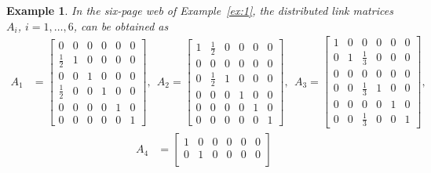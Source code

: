 \documentclass[11pt,draftcls,onecolumn]{IEEEtran}
\newtheorem{example}[theorem]{Example}
\begin{document}
\begin{example}\label{ex:3}\rm
In the six-page web of Example~\ref{ex:1}, 
the distributed link matrices $A_i$, $i=1,\ldots,6$, can be obtained as
\begin{align*}
A_1
  &= \begin{bmatrix}
       0           & 0 & 0           & 0 & 0 & 0\\
       \frac{1}{2} & 1 & 0           & 0 & 0 & 0\\
       0           & 0           & 1           & 0 & 0 & 0\\
       \frac{1}{2} & 0           & 0           & 1 & 0 & 0\\
       0           & 0           & 0           & 0 & 1 & 0\\
       0           & 0           & 0           & 0 & 0 & 1
     \end{bmatrix},~~
 A_2
  = \begin{bmatrix}
       1 &  \frac{1}{2}& 0           & 0 & 0 & 0\\
       0 & 0           &   0& 0 & 0 & 0\\
       0           &  \frac{1}{2}& 1 & 0 & 0 & 0\\
       0           & 0           & 0           & 1 & 0 & 0\\
       0           & 0           & 0           & 0 & 1 & 0\\
       0           & 0           & 0           & 0 & 0 & 1
     \end{bmatrix},~~
 A_3
  = \begin{bmatrix}
       1 & 0 & 0           & 0           & 0 & 0\\
       0 & 1           & \frac{1}{3} & 0           & 0 & 0\\
       0 & 0 & 0           & 0 & 0 & 0\\
       0 & 0           & \frac{1}{3} & 1 & 0 & 0\\
       0 & 0           & 0           & 0           & 1 & 0\\
       0 & 0           & \frac{1}{3} & 0           & 0 & 1
     \end{bmatrix},
\end{align*}
\begin{align*}
A_4
  &= \begin{bmatrix}
       1           & 0 & 0           & 0 & 0 & 0\\
       0 & 1 & 0           & 0 & 0 & 0\\

\end{bmatrix}
\end{align*}
\end{example}
\end{document}
